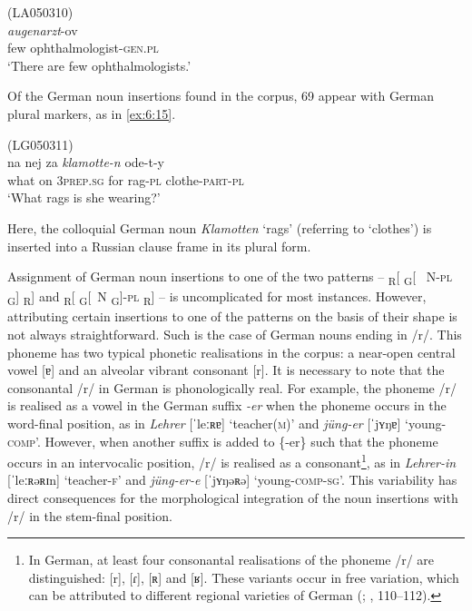\ea
\label{ex:6:14}
(LA050310)\\
 \textit{augenarzt}{-ov}\\
	few ophthalmologist-\textsc{gen.pl}\\
\glt `There are few ophthalmologists.'
\z

\noindent Of the German noun insertions found in the corpus, 69 appear with German plural markers, as in \ref{ex:6:15}.

\ea
\label{ex:6:15}
(LG050311)\\
 {na} {nej} {za} \textit{klamotte-n} {ode-t-y}\\
	what on \textsc{3prep.sg} for rag-\textsc{pl} clothe-\textsc{part-pl}\\
\glt `What rags is she wearing?'
\z

\noindent Here, the colloquial German noun \textit{Klamotten} `rags' (referring to `clothes') is inserted into a Russian clause frame in its plural form.

Assignment of German noun insertions to one of the two patterns  --  {\textsubscript{R}[ \textsubscript{G}[~ N-\textsc{pl} \textsubscript{G}] \textsubscript{R}]} and {\textsubscript{R}[ \textsubscript{G}[~N \textsubscript{G}]-\textsc{pl} \textsubscript{R}]}  --  is uncomplicated for most instances. However, attributing certain insertions to one of the patterns on the basis of their shape is not always straightforward. Such is the case of German nouns ending in /r/. This phoneme has two typical phonetic realisations in the corpus: a near-open central vowel [ɐ] and an alveolar vibrant consonant [r]. It is necessary to note that the consonantal /r/ in German is phonologically real. For example, the phoneme /r/ is realised as a vowel in the German suffix \textit{-er} when the phoneme occurs in the word-final position, as in \textit{Lehrer} [ˈleːʀɐ] `teacher(\textsc{m})' and \textit{jüng-er} [ˈjʏŋɐ] `young-\textsc{comp}'. However, when another suffix is added to \{-er\} such that the phoneme occurs in an intervocalic position, /r/ is realised as a consonant\footnote{In German, at least four consonantal realisations of the phoneme /r/ are distinguished: [r], [ɾ], [ʀ] and [ʁ]. These variants occur in free variation, which can be attributed to different regional varieties of German (\citealt[165--166]{kohler95}; \citealt[37--38]{ramers-vater}, 110--112).}, as in \textit{Lehrer-in} [ˈleːʀəʀɪn] `teacher-\textsc{f}' and \textit{jüng-er-e} [ˈjʏŋəʀə] `young-\textsc{comp-sg}'. This variability has direct consequences for the morphological integration of the noun insertions with /r/ in the stem-final position. 
	
